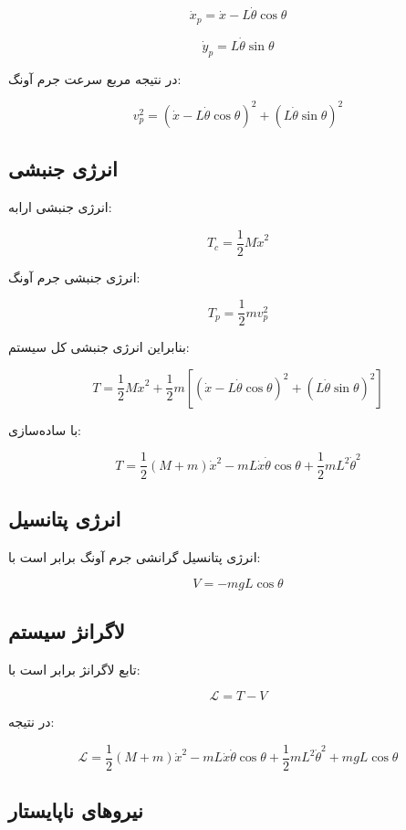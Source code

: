 \documentclass[a4paper,12pt]{article}
\begin{document}
\[
    \dot{x}_p = \dot{x} - L\dot{\theta}\cos\theta
\]

\[
    \dot{y}_p = L\dot{\theta}\sin\theta
\]

در نتیجه مربع سرعت جرم آونگ:

\[
    v_p^2
    =
    \left(
    \dot{x} - L\dot{\theta}\cos\theta
    \right)^2
    +
    \left(
    L\dot{\theta}\sin\theta
    \right)^2
\]

\subsection{انرژی جنبشی}

انرژی جنبشی ارابه:

\[
    T_c = \frac{1}{2}M\dot{x}^2
\]

انرژی جنبشی جرم آونگ:

\[
    T_p = \frac{1}{2}m v_p^2
\]

بنابراین انرژی جنبشی کل سیستم:

\[
    T
    =
    \frac{1}{2}M\dot{x}^2
    +
    \frac{1}{2}m
    \left[
        \left(
        \dot{x} - L\dot{\theta}\cos\theta
        \right)^2
        +
        \left(
        L\dot{\theta}\sin\theta
        \right)^2
        \right]
\]

با ساده‌سازی:

\[
    T
    =
    \frac{1}{2}(M+m)\dot{x}^2
    -
    mL\dot{x}\dot{\theta}\cos\theta
    +
    \frac{1}{2}mL^2\dot{\theta}^2
\]

\subsection{انرژی پتانسیل}

انرژی پتانسیل گرانشی جرم آونگ برابر است با:

\[
    V = -mgL\cos\theta
\]

\subsection{لاگرانژ سیستم}

تابع لاگرانژ برابر است با:

\[
    \mathcal{L} = T - V
\]

در نتیجه:

\[
    \mathcal{L}
    =
    \frac{1}{2}(M+m)\dot{x}^2
    -
    mL\dot{x}\dot{\theta}\cos\theta
    +
    \frac{1}{2}mL^2\dot{\theta}^2
    +
    mgL\cos\theta
\]

\subsection{نیروهای ناپایستار}
\end{document}
